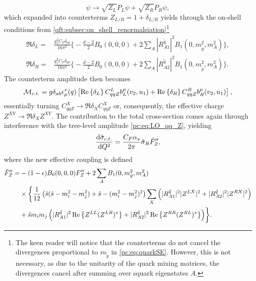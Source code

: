 \documentclass[../main.tex]{subfiles}
\begin{document}
\begin{equation}
  \psi \to \sqrt{Z_L} P_L \psi + \sqrt{Z_R} P_R \psi,
\end{equation}
which expanded into counterterms \(Z_{L/R} = 1 + \delta_{L/R}\) yields through the on-shell conditions from \cref{qft:subsec:on_shell_renormalsiation}\footnote{The keen reader will notice that the counterterms do not cancel the divergences proportional to \(m_{\tilde{g}}\) in \cref{pc:eq:quarkSE}. However, this is not necessary, as due to the unitarity of the quark mixing matrices, the divergences cancel after summing over squark eigenstates \(A\).}
\begin{subequations}
  \begin{align}
    \Re{\delta_L} = & \frac{g_s^2 C_F \delta_{ab}}{16\pi^2} \biggl\{
    -\frac{d-2}{2} B_0(0,0,0) + 2\sum_A|R^{\tilde{q}}_{A1}|^2B_1(0,m_{\tilde{g}}^2,m_A^2)
    \biggr\} ,                                                       \\
    \Re{\delta_R} = & \frac{g_s^2 C_F \delta_{ab}}{16\pi^2} \biggl\{
    -\frac{d-2}{2} B_0(0,0,0) + 2\sum_A|R^{\tilde{q}}_{A2}|^2B_1(0,m_{\tilde{g}}^2,m_A^2)
    \biggr\}.
  \end{align}
\end{subequations}
The counterterm amplitude then becomes
\begin{equation}
  \M_{c.t.} = g \delta_{ab} \epsilon_\mu^\ast(q) \bclosed{\Re{\delta_L} C_{qqZ}^L b_L^\mu(v_2,u_1) + \Re{\delta_R} C_{qqZ}^R b_R^\mu(v_2,u_1)},
\end{equation}
essentially turning \(C_{qqZ}^X \to \Re{\delta_X} C_{qqZ}^X\) or, consequently, the effective charge \(Z^{XY} \to \Re{\delta_X} Z^{XY}\).
The contribution to the total cross-section comes again through interference with the tree-level amplitude \cref{pc:eq:LO_qq_Z}, yielding
\begin{equation}
  \d[Q^2]{\hat\sigma_{c.t.}} = \frac{C_F \alpha_s}{2\pi} \hat\sigma_B \tilde{F}^{\prime\prime}_Z,
\end{equation}
where the new effective coupling is defined
\begin{align}
  \nonumber
  \tilde{F}^{\prime\prime}_Z = & -(1-\epsilon)B_0(0,0,0) F^{\prime\prime}_Z + 2 \sum_A B_1(0, m_{\tilde{g}}^2, m_A^2)                                                    \\
  \nonumber
                               & \times \biggl\{
  \frac{1}{12} \pclosed{\hat{s}(\hat{s}-m_i^2-m_j^2) + \hat{s} - (m_i^2-m_j^2)^2} \sum_{X} \pclosed{|R^{\tilde{q}}_{A1}|^2|Z^{LX}|^2 + |R^{\tilde{q}}_{A2}|^2|Z^{RX}|^2} \\
                               & + \hat{s}m_i m_j \pclosed{|R^{\tilde{q}}_{A1}|^2\Re{Z^{LL} (Z^{LR})^\ast} + |R^{\tilde{q}}_{A2}|^2\Re{Z^{RR} (Z^{RL})^\ast}}
  \biggr\}.
\end{align}
\end{document}
